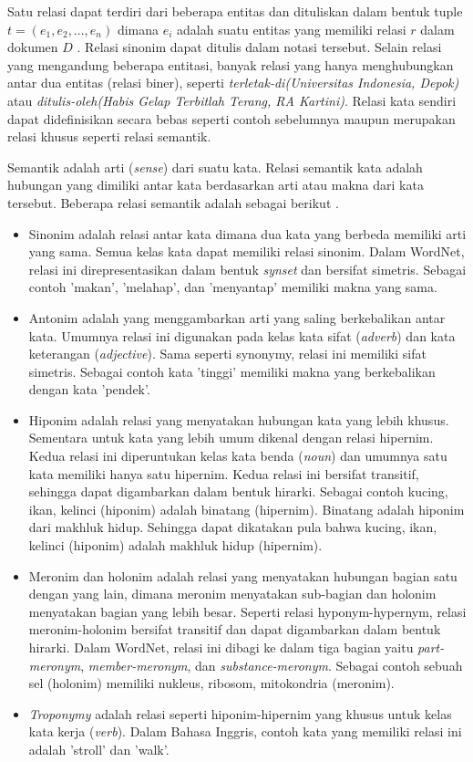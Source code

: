 Satu relasi dapat terdiri dari beberapa entitas dan dituliskan dalam bentuk tuple $t = (e_1, e_2, ..., e_n)$ dimana $e_i$ adalah suatu entitas yang memiliki relasi $r$ dalam dokumen $D$ \citep{bach2007review}. Relasi sinonim dapat ditulis dalam notasi tersebut. Selain relasi yang mengandung beberapa entitasi, banyak relasi yang hanya menghubungkan antar dua entitas (relasi biner), seperti \textit{terletak-di(Universitas Indonesia, Depok)} atau \textit{ditulis-oleh(Habis Gelap Terbitlah Terang, RA Kartini)}. Relasi kata sendiri dapat didefinisikan secara bebas seperti contoh sebelumnya maupun merupakan relasi khusus seperti relasi semantik.

Semantik adalah arti (\textit{sense}) dari suatu kata. Relasi semantik kata adalah hubungan yang dimiliki antar kata berdasarkan arti atau makna dari kata tersebut. Beberapa relasi semantik adalah sebagai berikut \citep{miller1995wordnet}.
\begin{itemize}
  \item Sinonim adalah relasi antar kata dimana dua kata yang berbeda memiliki arti yang sama. Semua kelas kata dapat memiliki relasi sinonim. Dalam WordNet, relasi ini direpresentasikan dalam bentuk \textit{synset} dan bersifat simetris. Sebagai contoh 'makan', 'melahap', dan 'menyantap' memiliki makna yang sama.
  \item Antonim adalah yang menggambarkan arti yang saling berkebalikan antar kata. Umumnya relasi ini digunakan pada kelas kata sifat (\textit{adverb}) dan kata keterangan (\textit{adjective}). Sama seperti synonymy, relasi ini memiliki sifat simetris. Sebagai contoh kata 'tinggi' memiliki makna yang berkebalikan dengan kata 'pendek'.
  \item Hiponim adalah relasi yang menyatakan hubungan kata yang lebih khusus. Sementara untuk kata yang lebih umum dikenal dengan relasi hipernim. Kedua relasi ini diperuntukan kelas kata benda (\textit{noun}) dan umumnya satu kata memiliki hanya satu hipernim. Kedua relasi ini bersifat transitif, sehingga dapat digambarkan dalam bentuk hirarki. Sebagai contoh kucing, ikan, kelinci (hiponim) adalah binatang (hipernim). Binatang adalah hiponim dari makhluk hidup. Sehingga dapat dikatakan pula bahwa kucing, ikan, kelinci (hiponim) adalah makhluk hidup (hipernim).
  \item Meronim dan holonim adalah relasi yang menyatakan hubungan bagian satu dengan yang lain, dimana meronim menyatakan sub-bagian dan holonim menyatakan bagian yang lebih besar. Seperti relasi hyponym-hypernym, relasi meronim-holonim bersifat transitif dan dapat digambarkan dalam bentuk hirarki. Dalam WordNet, relasi ini dibagi ke dalam tiga bagian yaitu \textit{part-meronym}, \textit{member-meronym}, dan \textit{substance-meronym}. Sebagai contoh sebuah sel (holonim) memiliki nukleus, ribosom, mitokondria (meronim).
  \item \textit{Troponymy} adalah relasi seperti hiponim-hipernim yang khusus untuk kelas kata kerja (\textit{verb}). Dalam Bahasa Inggris, contoh kata yang memiliki relasi ini adalah 'stroll' dan 'walk'.
\end{itemize}


